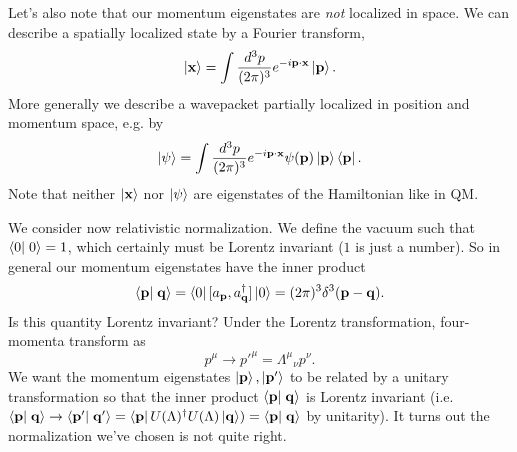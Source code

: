Let's also note that our momentum eigenstates are \emph{not} localized in space. We can describe a spatially localized state by a Fourier transform,
$$\left| \boldsymbol{\mathbf{x}} \right> = \int \frac{d^3 p}{(2\pi)^3} e^{-i \boldsymbol{\mathbf{p}} \cdot \boldsymbol{\mathbf{x}}} \left| \boldsymbol{\mathbf{p}} \right>.$$
More generally we describe a wavepacket partially localized in position and momentum space, e.g. by 
$$\left| \psi \right> = \int\frac{d^3p}{(2\pi)^3} e^{-i\boldsymbol{\mathbf{p}} \cdot \boldsymbol{\mathbf{x}}} \psi(\boldsymbol{\mathbf{p}})\left| \boldsymbol{\mathbf{p}} \right>\left< \boldsymbol{\mathbf{p}} \right|.$$
Note that neither $\left| \boldsymbol{\mathbf{x}} \right>$ nor $\left| \psi \right>$ are eigenstates of the Hamiltonian like in QM.

We consider now relativistic normalization. We define the vacuum such that $\braket{0}{0}=1$, which certainly must be Lorentz invariant ($1$ is just a number). So in general our momentum eigenstates have the inner product
$$\braket{\vec p}{\vec q}=\bra{0}[a_{\pv},a_{\vec q}^\dagger] \ket{0}=(2\pi)^3 \delta^3(\vec p - \vec q).$$
Is this quantity Lorentz invariant? Under the Lorentz transformation, four-momenta transform as $$p^\mu \to {p'}^\mu=\Lambda^\mu{}_\nu p^\nu.$$
We want the momentum eigenstates $\left| \boldsymbol{\mathbf{p}} \right>, \left| \boldsymbol{\mathbf{p}}' \right>$ to be related by a unitary transformation so that the inner product $\braket{\vec p}{\vec q}$ is Lorentz invariant (i.e. $\braket{\vec p}{\vec q}\to \braket{\vec p'}{\vec q'}=\bra{\pv}U(\Lambda)^\dagger U(\Lambda)\ket{\vec q})=\braket{\vec p}{\vec q}$ by unitarity). It turns out the normalization we've chosen is not quite right.


